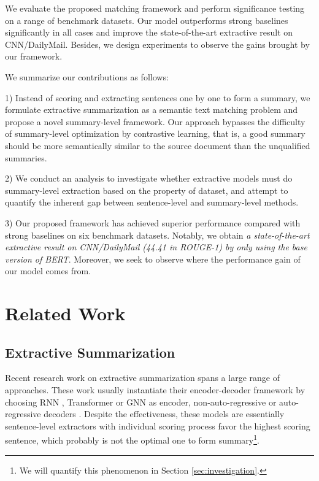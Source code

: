 \documentclass[11pt,a4paper]{article}
\begin{document}
We evaluate the proposed matching framework and perform significance testing on a range of benchmark datasets. Our model outperforms strong baselines significantly in all cases and improve the state-of-the-art extractive result on CNN/DailyMail. Besides, we design experiments to observe the gains brought by our framework.


We summarize our contributions as follows:

1) Instead of scoring and extracting sentences one by one to form a summary, we formulate extractive summarization as a semantic text matching problem and propose a novel summary-level framework. Our approach bypasses the difficulty of summary-level optimization by contrastive learning, that is, a good summary  should  be  more  semantically  similar to the source document than the unqualified summaries.




2) We conduct an analysis to investigate whether extractive models must do summary-level extraction based on the property of dataset, and attempt to quantify the inherent gap between sentence-level and summary-level methods.

3) Our proposed framework has achieved superior performance compared with strong baselines on six benchmark datasets. Notably, we obtain \textit{a state-of-the-art extractive result on CNN/DailyMail (44.41 in ROUGE-1) by only using the base version of BERT}. Moreover, we seek to observe where the performance gain of our model comes from.












\section{Related Work}


\subsection{Extractive Summarization}

Recent research work on extractive summarization spans a large range of approaches.
These work usually instantiate their encoder-decoder framework by choosing RNN \cite{zhou2018neural}, Transformer \cite{zhong2019closer, wang2019exploring} or GNN \cite{wang2020heterogeneous} as encoder, non-auto-regressive \cite{narayan2018ranking, arumae2018reinforced} or auto-regressive decoders \cite{jadhav2018extractive, liu2019text}. Despite the effectiveness, these models are essentially sentence-level extractors with individual scoring process favor the highest scoring sentence, which probably is not the optimal one to form summary\footnote{We will quantify this phenomenon in Section \ref{sec:investigation}.}.
\end{document}
